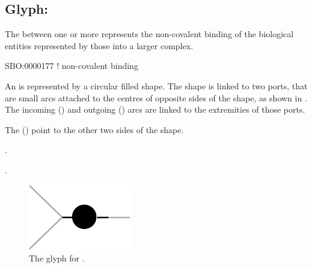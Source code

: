 \subsection{Glyph: }
\label{sec:association}

The  between one or more  represents the non-covalent binding of the biological entities represented by those  into a larger complex.

\begin{glyphDescription}

\glyphSboTerm
SBO:0000177 ! non-covalent binding



\glyphContainer
An  is represented by a circular filled shape.
The shape is linked to two ports, that are small arcs attached to the centres of opposite sides of the shape, as shown in .
The incoming  () and outgoing  () arcs are linked to the extremities of those ports.

The  () point to the other two sides of the shape.

\glyphLabel
{}.

\glyphAux
{}.

\end{glyphDescription}

\begin{figure}[H]
  \centering
  \includegraphics{images/association}
  \caption{The \PD glyph for .}
  \label{fig:association}
\end{figure}

